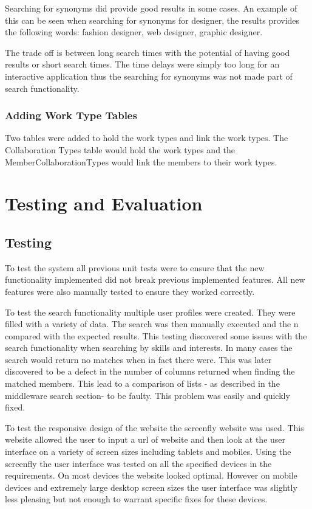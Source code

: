 \documentclass[a4paper,oneside,11pt]{report}
\begin{document}
Searching for synonyms did provide good results in some cases. An example of this can be seen when searching for synonyms for designer, the results provides the following words: fashion designer, web designer, graphic designer.

The trade off is between long search times with the potential of having good results or short search times. The time delays were simply too long for an interactive application thus the searching for synonyms was not made part of search functionality.

\subsubsection{Adding Work Type Tables}
Two tables were added to hold the work types and link the work types. The Collaboration Types table would hold the work types and the MemberCollaborationTypes would link the members to their work types. 

\pagebreak
\section{Testing and Evaluation}
\subsection{Testing}
To test the system all previous unit tests were to ensure that the new functionality implemented did not break previous implemented features. 	All new features were also manually tested to ensure they worked correctly.

To test the search functionality multiple user profiles were created. They were filled with a variety of data. The search was then manually executed and the n compared with the expected results. This testing discovered some issues with the search functionality when searching by skills and interests. In many cases the search would return no matches when in fact there were. This was later discovered to be a defect in the number of columns returned when finding the matched members. This lead to a comparison of lists - as described in the middleware search section- to be faulty. This problem was easily and quickly fixed.

To test the responsive design of the website the screenfly website was used. This website allowed the user to input a url of website and then look at the user interface on a variety of screen sizes including tablets and mobiles.  Using the screenfly the user interface was tested on all the specified devices in the requirements. On most devices the website looked optimal. However on mobile devices and extremely large desktop screen sizes the user interface was slightly less pleasing but not enough to warrant specific fixes for these devices.
\end{document}
